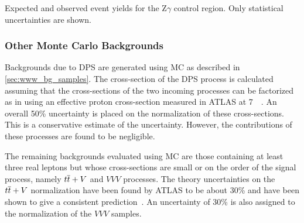 \begin{table}[ht!]
\centering

\caption{Expected and observed event yields for the Z$\gamma$ control region. 
Only statistical uncertainties are shown.}
\label{tab:Zgamma_CR}
\end{table}



\subsubsection{Other Monte Carlo Backgrounds}
\label{sec:otherbg}


Backgrounds due to DPS are generated using MC as described
in \sec\ref{sec:www_bg_samples}. The cross-section of the DPS process
is calculated assuming that the cross-sections of the two incoming processes
can be factorized as in \cite{Gaunt:2010pi} using an effective
proton cross-section measured in ATLAS at 7~\TeV~\cite{Aad:2013bjm}.
An overall 50\% uncertainty is placed on the normalization of these cross-sections.
This is a conservative estimate of the uncertainty.
However, the contributions of these processes are found to be negligible.


The remaining backgrounds evaluated using MC are those containing 
at least three real leptons but whose cross-sections are small or on 
the order of the signal process, namely $t\overline{t}+V$ and $VVV$ processes.
The theory uncertainties on the $t\overline{t}+V$ normalization have been found by
ATLAS to be about 30\% and have been shown to give a 
consistent prediction~\cite{ATLAS-CONF-2015-032}. 
An uncertainty of 30\% is also assigned to the normalization of the 
$VVV$ samples.
